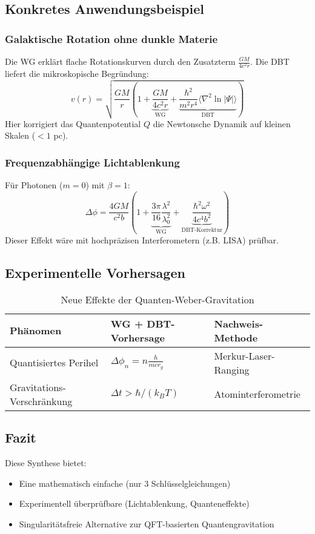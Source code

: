 \subsection{Konkretes Anwendungsbeispiel}
\subsubsection{Galaktische Rotation ohne dunkle Materie}
Die WG erklärt flache Rotationskurven durch den Zusatzterm $\frac{GM}{4c^2r}$. Die DBT liefert die mikroskopische Begründung:
\begin{equation}
    v(r) = \sqrt{\frac{GM}{r}\left(1 + \underbrace{\frac{GM}{4c^2r}}_{\text{WG}} + \underbrace{\frac{\hbar^2}{m^2r^4}\langle \nabla^2 \ln|\Psi| \rangle}_{\text{DBT}}\right)}
\end{equation}
Hier korrigiert das Quantenpotential $Q$ die Newtonsche Dynamik auf kleinen Skalen ($<1$ pc).

\subsubsection{Frequenzabhängige Lichtablenkung}
Für Photonen ($m=0$) mit $\beta=1$:
\begin{equation}
    \Delta\phi = \frac{4GM}{c^2b}\left(1 + \underbrace{\frac{3\pi}{16}\frac{\lambda^2}{\lambda_0^2}}_{\text{WG}} + \underbrace{\frac{\hbar^2\omega^2}{4c^4b^2}}_{\text{DBT-Korrektur}}\right)
\end{equation}
Dieser Effekt wäre mit hochpräzisen Interferometern (z.B. LISA) prüfbar.

\subsection{Experimentelle Vorhersagen}
\begin{table}[h]
    \centering
    \begin{tabular}{lll}
        \toprule
        Phänomen & WG + DBT-Vorhersage & Nachweis-Methode \\
        \midrule
        Quantisiertes Perihel & $\Delta\phi_n = n\frac{h}{mcr_g}$ & Merkur-Laser-Ranging \\
        Gravitations-Verschränkung & $\Delta t > \hbar/(k_B T)$ & Atominterferometrie \\
        \bottomrule
    \end{tabular}
    \caption{Neue Effekte der Quanten-Weber-Gravitation}
\end{table}

\subsection{Fazit}
Diese Synthese bietet:
\begin{itemize}
    \item Eine mathematisch einfache (nur 3 Schlüsselgleichungen)
    \item Experimentell überprüfbare (Lichtablenkung, Quanteneffekte)
    \item Singularitätsfreie Alternative zur QFT-basierten Quantengravitation
\end{itemize}

